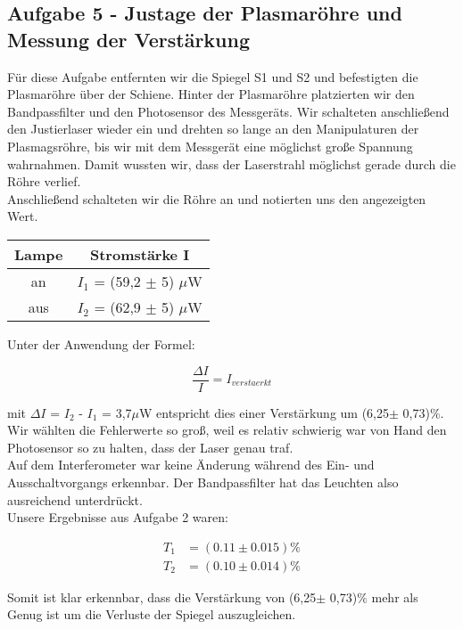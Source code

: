 \subsection{Aufgabe 5 - Justage der Plasmaröhre und Messung der Verstärkung}

Für diese Aufgabe entfernten wir die Spiegel S1 und S2 und befestigten die Plasmaröhre über der Schiene. Hinter der Plasmaröhre platzierten wir den Bandpassfilter und den Photosensor des Messgeräts. Wir schalteten anschließend den Justierlaser wieder ein und drehten so lange an den Manipulaturen der Plasmagsröhre, bis wir mit dem Messgerät eine möglichst große Spannung wahrnahmen. Damit wussten wir, dass der Laserstrahl möglichst gerade durch die Röhre verlief.\\
Anschließend schalteten wir die Röhre an und notierten uns den angezeigten Wert.\\

\begin{center}
\begin{tabular}{c | c}
Lampe & Stromstärke I\\
\hline
an & $I_1$ = (59,2 $\pm$ 5) $\mu$W\\
aus & $I_2$ = (62,9 $\pm$ 5) $\mu$W
\end{tabular}
\end{center}

Unter der Anwendung der Formel:

\begin{equation}
\frac{\Delta I}{I} = I_{verstaerkt}
\end{equation}

mit $\Delta I$ = $I_2$ - $I_1$ = 3,7$\mu$W entspricht dies einer Verstärkung um (6,25$\pm$ 0,73)$\%$. Wir wählten die Fehlerwerte so groß, weil es relativ schwierig war von Hand den Photosensor so zu halten, dass der Laser genau traf.\\
Auf dem Interferometer war keine Änderung während des Ein- und Ausschaltvorgangs erkennbar. Der Bandpassfilter hat das Leuchten also ausreichend unterdrückt.\\
Unsere Ergebnisse aus Aufgabe 2 waren:

\begin{align*}
	T_{1} &= (0.11 \pm 0.015)\% \\
	T_{2} &= (0.10 \pm 0.014)\% 
\end{align*}

Somit ist klar erkennbar, dass die Verstärkung von (6,25$\pm$ 0,73)$\%$ mehr als Genug ist um die Verluste der Spiegel auszugleichen.